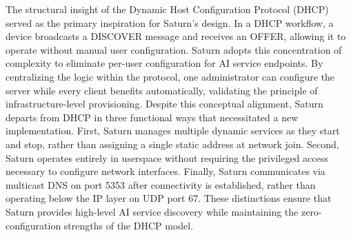 The structural insight of the Dynamic Host Configuration Protocol (DHCP) \cite{rfc2131} served as the primary inspiration for Saturn's design. In a DHCP workflow, a device broadcasts a DISCOVER message and receives an OFFER, allowing it to operate without manual user configuration. Saturn adopts this concentration of complexity to eliminate per-user configuration for AI service endpoints. By centralizing the logic within the protocol, one administrator can configure the server while every client benefits automatically, validating the principle of infrastructure-level provisioning. Despite this conceptual alignment, Saturn departs from DHCP in three functional ways that necessitated a new implementation. First, Saturn manages multiple dynamic services as they start and stop, rather than assigning a single static address at network join. Second, Saturn operates entirely in userspace without requiring the privileged access necessary to configure network interfaces. Finally, Saturn communicates via multicast DNS on port 5353 after connectivity is established, rather than operating below the IP layer on UDP port 67. These distinctions ensure that Saturn provides high-level AI service discovery while maintaining the zero-configuration strengths of the DHCP model.